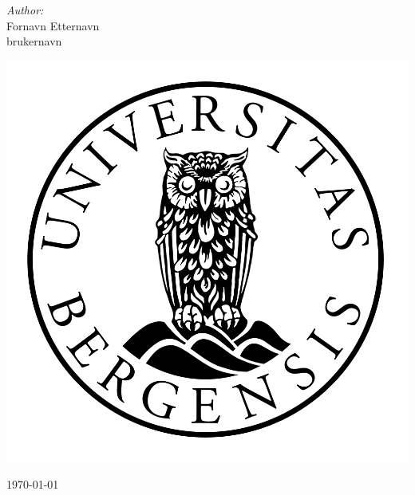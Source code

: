 \begin{titlepage}
\Large \emph{Author:}\\
Fornavn Etternavn\\brukernavn
\\[2cm] %
\centerline{\includegraphics[scale=0.15]{figures/canvas}} %

{\large \today}\\[3cm] %


\vfill %

\end{titlepage}



